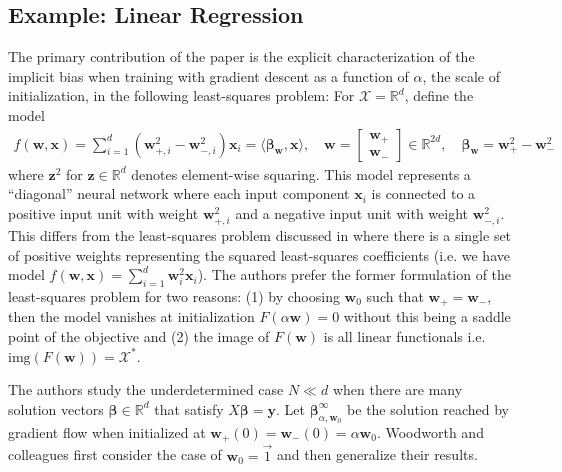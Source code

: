 \documentclass{article}
\begin{document}
\subsection{Example: Linear Regression}
The primary contribution of the paper is the explicit characterization of the implicit bias when training with gradient descent as a function of $\alpha$, the scale of initialization, in the following least-squares problem:
For $\mathcal{X} = \mathbb{R}^d$, define the model
\begin{align*}
    f(\boldsymbol{w}, \boldsymbol{x}) = \sum_{i=1}^d (\boldsymbol{w}_{+, i}^2 - \boldsymbol{w}_{-, i}^2)\boldsymbol{x}_i = \langle \boldsymbol{\beta}_{\boldsymbol{w}}, \boldsymbol{x} \rangle, \quad \boldsymbol{w} = \begin{bmatrix}
                        \boldsymbol{w}_+ \\
                        \boldsymbol{w}_-
                        \end{bmatrix} \in \mathbb{R}^{2d},
    \quad \boldsymbol{\beta}_{\boldsymbol{w}} = \boldsymbol{w}_+^2 - \boldsymbol{w}_-^2
\end{align*}
where $\boldsymbol{z}^2$ for $\boldsymbol{z} \in \mathbb{R}^d$ denotes element-wise squaring. This model represents a \enquote{diagonal} neural network where each input component $\boldsymbol{x}_i$ is connected to a positive input unit with weight $\boldsymbol{w}_{+, i}^2$ and a negative input unit with weight $\boldsymbol{w}_{-, i}^2$. This differs from the least-squares problem discussed in \cite{gunasekar2018implicit} where there is a single set of positive weights representing the squared least-squares coefficients (i.e. we have model $f(\boldsymbol{w}, \boldsymbol{x}) = \sum_{i=1}^d \boldsymbol{w}_i^2\boldsymbol{x}_i$). The authors prefer the former formulation of the least-squares problem for two reasons: (1) by choosing $\boldsymbol{w}_0$ such that $\boldsymbol{w}_+ = \boldsymbol{w}_-$, then the model vanishes at initialization $F(\alpha \boldsymbol{w}) = 0$ without this being a saddle point of the objective and (2) the image of $F(\boldsymbol{w})$ is all linear functionals i.e. $\text{img}( F(\boldsymbol{w})) = \mathcal{X}^*$.

The authors study the underdetermined case $N \ll d$ when there are many solution vectors $\boldsymbol{\beta} \in \mathbb{R}^d$ that satisfy $X 
\boldsymbol{\beta} = \boldsymbol{y}$. Let $\boldsymbol{\beta}_{\alpha, \boldsymbol{w}_0}^{\infty}$ be the solution reached by gradient flow when initialized at $\boldsymbol{w}_+(0) = \boldsymbol{w}_-(0) = \alpha \boldsymbol{w}_0$. Woodworth and colleagues first consider the case of $\boldsymbol{w}_0 = \vec{1}$ and then generalize their results.
\end{document}
